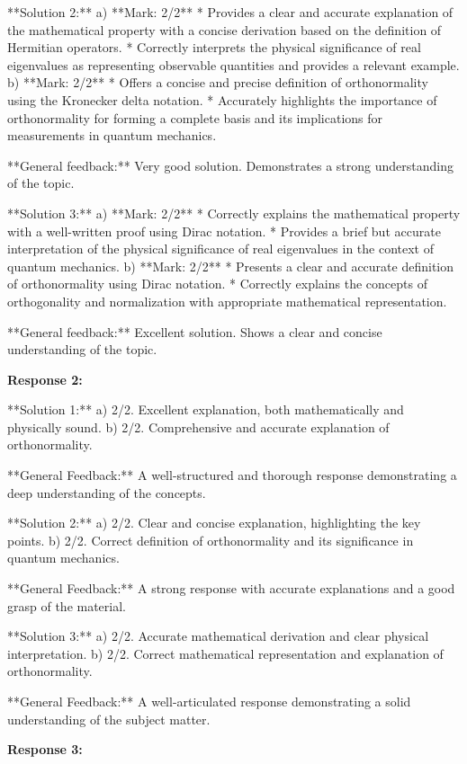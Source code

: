 \documentclass[a4paper,11pt]{article}
\begin{document}
**Solution 2:**
a) **Mark: 2/2**
* Provides a clear and accurate explanation of the mathematical property with a concise derivation based on the definition of Hermitian operators.
* Correctly interprets the physical significance of real eigenvalues as representing observable quantities and provides a relevant example.
b) **Mark: 2/2**
* Offers a concise and precise definition of orthonormality using the Kronecker delta notation.
* Accurately highlights the importance of orthonormality for forming a complete basis and its implications for measurements in quantum mechanics.

**General feedback:** Very good solution. Demonstrates a strong understanding of the topic. 

**Solution 3:**
a) **Mark: 2/2** 
* Correctly explains the mathematical property with a well-written proof using Dirac notation.
* Provides a brief but accurate interpretation of the physical significance of real eigenvalues in the context of quantum mechanics.
b) **Mark: 2/2**
* Presents a clear and accurate definition of orthonormality using Dirac notation.
* Correctly explains the concepts of orthogonality and normalization with appropriate mathematical representation. 

**General feedback:** Excellent solution. Shows a clear and concise understanding of the topic. 

\bigskip    
\textbf{Response 2:}

**Solution 1:**
a) 2/2. Excellent explanation, both mathematically and physically sound.
b) 2/2. Comprehensive and accurate explanation of orthonormality.

**General Feedback:** A well-structured and thorough response demonstrating a deep understanding of the concepts.

**Solution 2:**
a) 2/2. Clear and concise explanation, highlighting the key points.
b) 2/2. Correct definition of orthonormality and its significance in quantum mechanics.

**General Feedback:** A strong response with accurate explanations and a good grasp of the material.

**Solution 3:**
a) 2/2. Accurate mathematical derivation and clear physical interpretation.
b) 2/2. Correct mathematical representation and explanation of orthonormality.

**General Feedback:** A well-articulated response demonstrating a solid understanding of the subject matter.

\bigskip    
\textbf{Response 3:}
\end{document}
